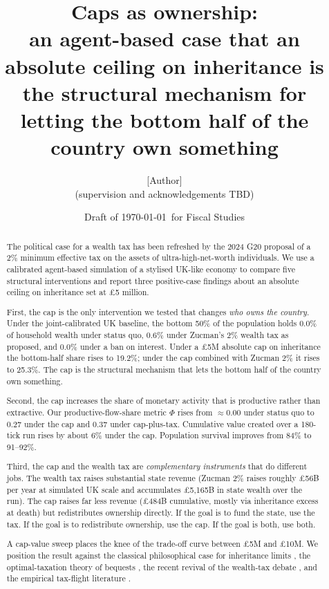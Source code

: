 \documentclass[11pt]{article}
\title{Caps as ownership:\\
\large an agent-based case that an absolute ceiling on inheritance is
the structural mechanism for letting the bottom half of the country
own something}
\author{[Author]\\
\small (supervision and acknowledgements TBD)}
\date{Draft of \today\ for Fiscal Studies}
\begin{document}
\maketitle

\begin{abstract}
The political case for a wealth tax has been refreshed by the 2024
\citet{zucman2024global} G20 proposal of a 2\% minimum effective
tax on the assets of ultra-high-net-worth individuals.  We use a
calibrated agent-based simulation of a stylised UK-like economy to
compare five structural interventions and report three positive-case
findings about an absolute ceiling on inheritance set at
\pounds 5 million.

First, the cap is the only intervention we tested that changes
\emph{who owns the country}.  Under the joint-calibrated UK
baseline, the bottom 50\% of the population holds 0.0\% of household
wealth under status quo, 0.6\% under Zucman's 2\% wealth tax as
proposed, and 0.0\% under a ban on interest.  Under a \pounds 5M
absolute cap on inheritance the bottom-half share rises to 19.2\%;
under the cap combined with Zucman 2\% it rises to 25.3\%.  The cap
is the structural mechanism that lets the bottom half of the
country own something.

Second, the cap increases the share of monetary activity that is
productive rather than extractive.  Our productive-flow-share
metric $\Phi$ rises from $\approx 0.00$ under status quo to $0.27$
under the cap and $0.37$ under cap-plus-tax.  Cumulative value
created over a 180-tick run rises by about 6\% under the cap.
Population survival improves from 84\% to 91--92\%.

Third, the cap and the wealth tax are \emph{complementary
instruments} that do different jobs.  The wealth tax raises
substantial state revenue (Zucman 2\% raises roughly \pounds 56B
per year at simulated UK scale and accumulates \pounds 5,165B in
state wealth over the run).  The cap raises far less revenue
(\pounds 484B cumulative, mostly via inheritance excess at death)
but redistributes ownership directly.  If the goal is to fund the
state, use the tax.  If the goal is to redistribute ownership, use
the cap.  If the goal is both, use both.

A cap-value sweep places the knee of the trade-off curve between
\pounds 5M and \pounds 10M.  We position the result against the
classical philosophical case for inheritance limits
\citep{mill1848principles, carnegie1889wealth, rignano1924bequest,
atkinson2015inequality, piketty2020capital}, the optimal-taxation
theory of bequests \citep{piketty2013theory, farhi2010progressive,
kopczuk2013taxation}, the recent revival of the wealth-tax debate
\citep{saez2019triumph, zucman2024global, oecd2021inheritance}, and
the empirical tax-flight literature
\citep{young2016millionaire, akcigit2016inventors, moretti2017taxing}.


\end{abstract}
\end{document}
